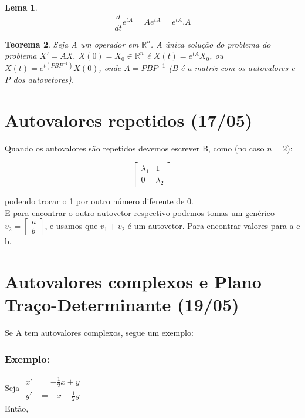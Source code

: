 \documentclass[12pt]{article}
\newtheorem{theorem}{Teorema}[section]
\newtheorem{lemma}[theorem]{Lema}
\begin{document}
\begin{lemma}
    $$\dfrac{d}{d t} e^{t A} = A e^{t A} = e^{t A} . A$$
\end{lemma}

\begin{theorem}
    Seja A um operador em $\mathbb{R}^n$. A única solução do problema do problema $X' = A X, \ X(0) = X_0 \in \mathbb{R}^n$ é $X(t) = e^{tA} X_0$, ou $X(t) = e^{t (P B P^{-1})} X(0)$, onde $A = P B P^{-1}$ (B é a matriz com os autovalores e P dos autovetores).
\end{theorem}

\section{Autovalores repetidos (17/05)}
Quando os autovalores são repetidos devemos escrever B, como (no caso $n = 2$):

$$
\left [
\begin{array}{cc}
    \lambda_1 & 1 \\
    0 & \lambda_2
\end{array}
\right ]
$$

podendo trocar o 1 por outro número diferente de 0.\\

E para encontrar o outro autovetor respectivo podemos tomas um genérico $v_2 = \left [ \begin{array}{c}
     a \\
     b
\end{array}
\right ]$, e usamos que $v_1 + v_2$ é um autovetor. Para encontrar valores para a e b.

\section{Autovalores complexos e Plano Traço-Determinante (19/05)}
Se A tem autovalores complexos, segue um exemplo:

\subsubsection*{Exemplo:}

Seja $\begin{array}{cc}
    x' & = - \frac{1}{2}x + y \\
    y' & = - x - \frac{1}{2}y
\end{array}$\\

Então,
\end{document}

